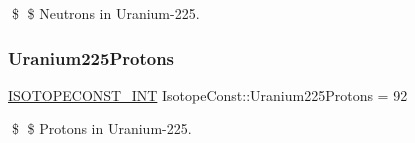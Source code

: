 \$ \$ Neutrons in Uranium-\/225. \mbox{\label{group___isotope_const-_uranium-_u225_gaa25fb90abd0fffa3f11fcc0a6bca713b}} 
\subsubsection{\texorpdfstring{Uranium225\+Protons}{Uranium225Protons}}
{\footnotesize\ttfamily \mbox{\hyperlink{group___isotope_const-_macros_ga5f18360b3e99483a35c32d789e62621c}{I\+S\+O\+T\+O\+P\+E\+C\+O\+N\+S\+T\+\_\+\+I\+NT}} Isotope\+Const\+::\+Uranium225\+Protons = 92}

\$ \$ Protons in Uranium-\/225. 